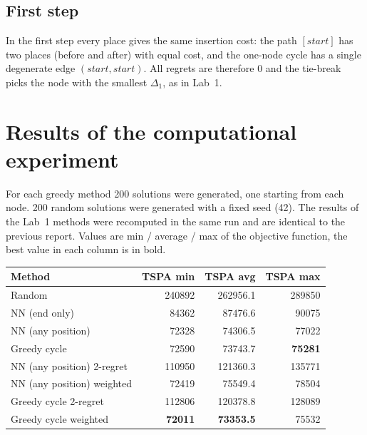 \documentclass[11pt,a4paper]{article}
\begin{document}
\subsection*{First step}
In the first step every place gives the same insertion cost: the path $[\mathit{start}]$ has two
places (before and after) with equal cost, and the one-node cycle has a single degenerate edge
$(\mathit{start}, \mathit{start})$. All regrets are therefore 0 and the tie-break picks the node
with the smallest $\Delta_1$, as in Lab~1.

\section{Results of the computational experiment}

For each greedy method 200 solutions were generated, one starting from each node. 200 random
solutions were generated with a fixed seed (42). The results of the Lab~1 methods were recomputed
in the same run and are identical to the previous report. Values are min / average / max of the
objective function, the best value in each column is in bold.

\begin{table}[H]
\centering
\begin{tabular}{lrrr}
\toprule
Method & TSPA min & TSPA avg & TSPA max \\
\midrule
Random & 240892 & 262956.1 & 289850 \\
NN (end only) & 84362 & 87476.6 & 90075 \\
NN (any position) & 72328 & 74306.5 & 77022 \\
Greedy cycle & 72590 & 73743.7 & \textbf{75281} \\
\midrule
NN (any position) 2-regret & 110950 & 121360.3 & 135771 \\
NN (any position) weighted & 72419 & 75549.4 & 78504 \\
Greedy cycle 2-regret & 112806 & 120378.8 & 128089 \\
Greedy cycle weighted & \textbf{72011} & \textbf{73353.5} & 75532 \\
\bottomrule
\end{tabular}
\end{table}
\end{document}
